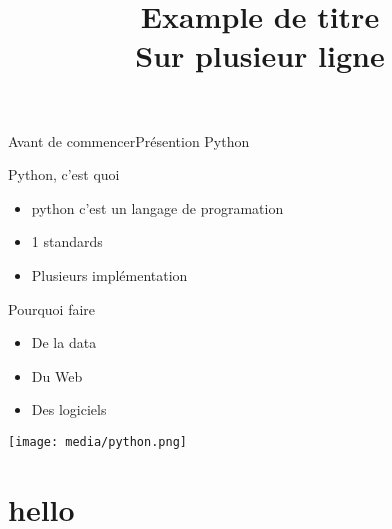 \documentclass[aspectratio=169, xetex, 12pt]{beamer}
\title{Example de titre \\Sur plusieur ligne}
\begin{document}
    \begin{frame}
        \titlepage
    \end{frame}

    \begin{frame}{Avant de commencer}{Présention Python}
        \begin{block}{Python, c'est quoi}
            \begin{minipage}{0.7\paperwidth}
                \begin{itemize}
                    \item python c'est un langage de programation
                    \item 1 standards
                    \item Plusieurs implémentation
                \end{itemize}
            \end{minipage}
        \end{block}
        \begin{block}{Pourquoi faire}
            \begin{minipage}{0.7\paperwidth}
                \begin{itemize}
                    \item De la data
                    \item Du Web
                    \item Des logiciels
                \end{itemize}
            \end{minipage}
            \begin{minipage}{0.2\paperwidth}
                \begin{center}
                    \texttt{[image: media/python.png]}
                \end{center}
            \end{minipage}
        \end{block}
    \end{frame}

    \section{hello}
\end{document}

